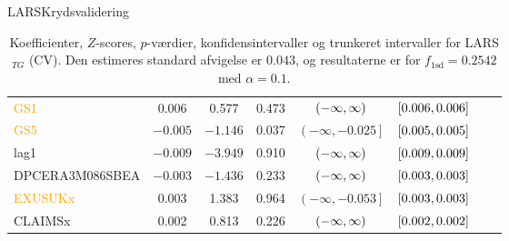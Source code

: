 \begin{frame}{LARS}{Krydsvalidering}
\begin{table}[ht]
{\begin{tabular}{lccccccc}
\textcolor{orange}{GS1} &   0.006&   0.577    &0.473  &    $\del{-\infty  ,  \infty}$  &$\sbr{0.006 ,0.006}$ \\  
\textcolor{orange}{GS5} & $-0.005$ & $-1.146 $ &0.037 &     $\left( -\infty ,  -0.025\right]   $ & $\sbr{0.005 ,0.005 }$\\  
 \textcolor{blue3}{lag1}  & $-0.009$  &$-3.949$   & 0.910   & $\del{-\infty  ,  \infty }$  &$\sbr{0.009, 0.009 }$ \\ 
 \textcolor{red3}{DPCERA3M086SBEA} & $- 0.003$ & $-1.436$ & 0.233  &   $\del{-\infty   ,  \infty }$ &  $\sbr{0.003, 0.003}$ \\ 
\textcolor{orange}{ EXUSUKx}  &  0.003   &1.383 & 0.964   &   $\left( -\infty     ,-0.053 \right] $&  $\sbr{0.003, 0.003 }$   \\   
 \textcolor{blue3}{CLAIMSx} &0.002 &  0.813   & 0.226 &    $\del{-\infty  ,  \infty}$& $\sbr{0.002 ,0.002 }$   \\ 
\bottomrule
\end{tabular}  
}
\caption{Koefficienter, \(Z\)-scores, \(p\)-værdier, konfidensintervaller og trunkeret intervaller for LARS$_{TG}$ (CV). Den estimeres standard afvigelse er \(0.043\), og resultaterne er for \(f_{1 \text{sd}} = 0.2542\) med \(\alpha = 0.1\).} \label{tab:larInf_kryds}
\end{table} 
\end{frame}


